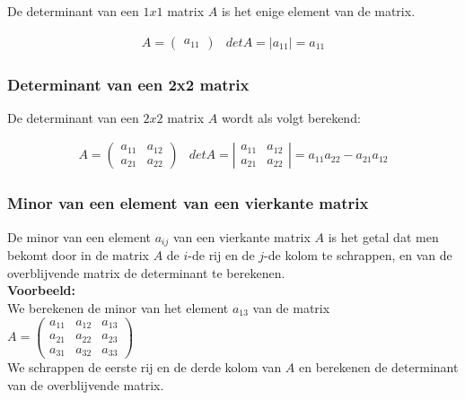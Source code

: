De determinant van een $1x1$ matrix $A$ is het enige element van de matrix.

\[ \begin{array}{ll}
A=\left( \begin{matrix} a_{11} \end{matrix} \right) & det A = |a_{11}|=a_{11} 
\end{array}
\]

\subsubsection{Determinant van een 2x2 matrix}

De determinant van een $2x2$ matrix $A$ wordt als volgt berekend:

\[ \begin{array}{ll}
A=\left( \begin{matrix} a_{11} & a_{12} \\ a_{21} & a_{22}  \end{matrix} \right) & det A = \left| \begin{matrix} a_{11} & a_{12} \\ a_{21} & a_{22}  \end{matrix} \right| = a_{11}a_{22}-a_{21}a_{12}   
\end{array}
\]

\subsubsection{Minor van een element van een vierkante matrix}

De minor van een element $a_{ij}$ van een vierkante matrix $A$ is het getal dat men bekomt door in de matrix $A$ de $i$-de rij en de $j$-de kolom te schrappen, en van de overblijvende matrix de determinant te berekenen.\\

{\bf Voorbeeld:}\\

We berekenen de minor van het element $a_{13}$ van de matrix $A=\left( \begin{matrix} a_{11} & a_{12} & a_{13} \\ a_{21} & a_{22} & a_{23} \\ a_{31} & a_{32} & a_{33} \end{matrix} \right)$\\

We schrappen de eerste rij en de derde kolom van $A$ en berekenen de determinant van de overblijvende matrix.

